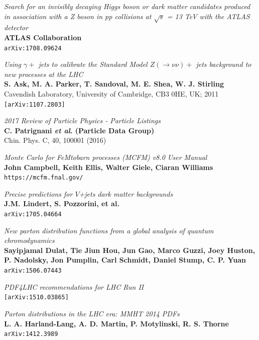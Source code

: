 \documentclass[11pt,a4paper]{report}
\begin{document}
\begin{thebibliography}{9}

	\textit{Search for an invisibly decaying Higgs boson or dark matter candidates produced in association with a Z boson in pp collisions at $\sqrt{s}$ = 13 TeV with the ATLAS detector}\\
	\textbf{ATLAS Collaboration}\\
	\texttt{arXiv:1708.09624}
	
	\textit{Using $\gamma +$ jets to calibrate the Standard Model $Z(\rightarrow \nu\nu)+$ jets background to new processes at the LHC}\\
	\textbf{S. Ask, M. A. Parker, T. Sandoval, M. E. Shea, W. J. Stirling}\\
Cavendish Laboratory, University of Cambridge, CB3 0HE, UK; 2011\\
	\texttt{[arXiv:1107.2803]}

	\textit{2017 Review of Particle Physics - Particle Listings}\\
	\textbf{C. Patrignani \textit{et al}. (Particle Data Group)}\\
	Chin. Phys. C, 40, 100001 (2016)
	
	\textit{Monte Carlo for FeMtobarn processes (MCFM) v8.0 User Manual}\\
	\textbf{John Campbell, Keith Ellis, Walter Giele, Ciaran Williams}\\
	\texttt{https://mcfm.fnal.gov/}
	
	\textit{Precise predictions for $V$+jets dark matter backgrounds}\\
	\textbf{J.M. Lindert, S. Pozzorini, et al.}\\
	\texttt{arXiv:1705.04664}
	
	\textit{New parton distribution functions from a global analysis of quantum chromodynamics}\\
	\textbf{Sayipjamal Dulat, Tie Jiun Hou, Jun Gao, Marco Guzzi, Joey Huston, P. Nadolsky, Jon Pumplin, Carl Schmidt, Daniel Stump, C. P. Yuan}\\
	\texttt{arXiv:1506.07443}

	\textit{PDF4LHC recommendations for LHC Run II}\\
	\texttt{[arXiv:1510.03865]}	
	
	\textit{Parton distributions in the LHC era: MMHT 2014 PDFs}\\
	\textbf{L. A. Harland-Lang, A. D. Martin, P. Motylinski, R. S. Thorne}\\
	\texttt{arXiv:1412.3989}
	

\end{thebibliography}
\end{document}
